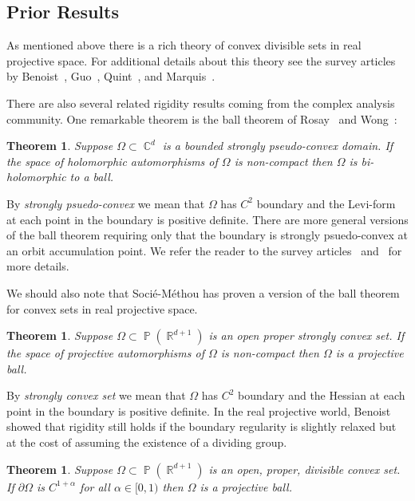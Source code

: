 \documentclass[12pt]{amsart}
\theoremstyle{plain}
\newtheorem{theorem}[proposition]{Theorem}
\theoremstyle{definition}
\theoremstyle{remark}
\begin{document}
\subsection{Prior Results} As mentioned above there is a rich theory of convex divisible sets in real projective space. For additional details about this theory see the survey articles by Benoist~\cite{B2008}, Guo~\cite{G2013}, Quint~\cite{Q2010}, and Marquis~\cite{M2013}.

There are also several related rigidity results coming from the complex analysis community. One remarkable theorem is the ball theorem of Rosay~\cite{R1979} and Wong~\cite{W1977}:

\begin{theorem}
Suppose $\Omega \subset \operatorname{\mathbb{C}}^d$ is a bounded strongly pseudo-convex domain. If the space of holomorphic automorphisms of $\Omega$ is non-compact then $\Omega$ is bi-holomorphic to a ball.
\end{theorem}

By \emph{strongly psuedo-convex} we mean that $\Omega$ has $C^2$ boundary and the Levi-form at each point in the boundary is positive definite. There are more general versions of the ball theorem requiring only that the boundary is strongly psuedo-convex at an orbit accumulation point. We refer the reader to the survey articles~\cite{IK1999} and~\cite{K2013} for more details. 

We should also note that Soci{\'e}-M{\'e}thou has proven a version of the ball theorem for convex sets in real projective space.

\begin{theorem}\cite{SM2002}
Suppose $\Omega \subset \operatorname{\mathbb{P}}(\operatorname{\mathbb{R}}^{d+1})$ is an open proper strongly convex set. If the space of projective automorphisms of $\Omega$ is non-compact then $\Omega$ is a projective ball. 
\end{theorem}

By \emph{strongly convex set} we mean that $\Omega$ has $C^2$ boundary and the Hessian at each point in the boundary is positive definite. In the real projective world, Benoist showed that rigidity still holds if the boundary regularity is slightly relaxed but at the cost of assuming the existence of a dividing group.

\begin{theorem}\cite[Theorem 1.3]{B2004}
Suppose $\Omega \subset \operatorname{\mathbb{P}}(\operatorname{\mathbb{R}}^{d+1})$ is an open, proper, divisible convex set. If $\partial \Omega$ is $C^{1+\alpha}$ for all $\alpha \in [0,1)$ then $\Omega$ is a projective ball.
\end{theorem}
\end{document}
